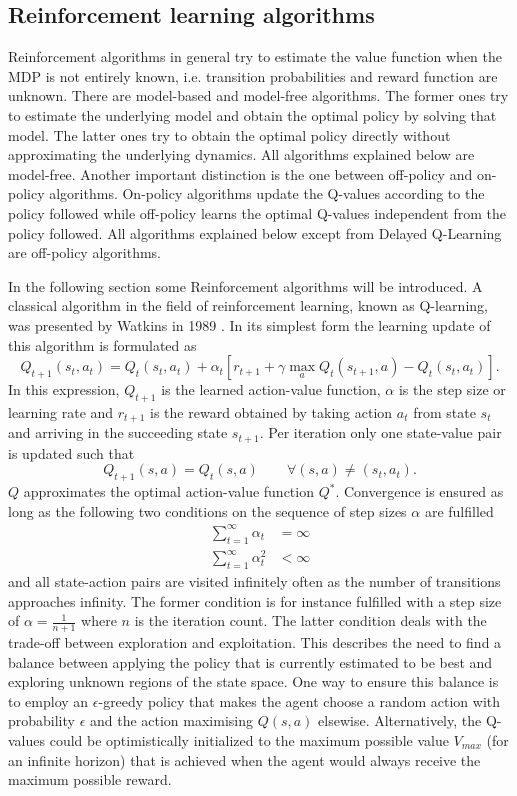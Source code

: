 \documentclass[../main.tex]{subfiles}
\begin{document}
\subsection{Reinforcement learning algorithms}
Reinforcement algorithms in general try to estimate the value function when the MDP is not entirely known, i.e. transition probabilities and reward function are unknown. There are model-based and model-free algorithms. The former ones try to estimate the underlying model and obtain the optimal policy by solving that model. The latter ones try to obtain the optimal policy directly without approximating the underlying dynamics. All algorithms explained below are model-free. Another important distinction is the one between off-policy and on-policy algorithms. On-policy algorithms update the Q-values according to the policy followed while off-policy learns the optimal Q-values independent from the policy followed. All algorithms explained below except from Delayed Q-Learning are off-policy algorithms.\par
In the following section some Reinforcement algorithms will be introduced. A classical algorithm in the field of reinforcement learning, known as Q-learning, was presented by Watkins in 1989 \cite{watkins1992q}. In its simplest form the learning update of this algorithm is formulated as
\begin{equation}
Q_{t+1}(s_t,a_t) = Q_{t}(s_t,a_t) + \alpha_t \left[ r_{t+1}+\gamma \max_a Q_{t}(s_{t+1},a) - Q_{t}(s_t,a_t)\right].
\end{equation}
In this expression, $Q_{t+1}$ is the learned action-value function, $\alpha$ is the step size or learning rate and $r_{t+1}$ is the reward obtained by taking action $a_t$ from state $s_t$ and arriving in the succeeding state $s_{t+1}$.
Per iteration only one state-value pair is updated such that
\begin{equation}
    Q_{t+1}(s,a) = Q_{t}(s,a) \qquad \forall (s,a) \neq (s_t,a_t).
\end{equation}
$Q$ approximates the optimal action-value function $Q^*$. Convergence is ensured as long as the following two conditions on the sequence of step sizes $\alpha$ are fulfilled \cite{jaakkola1994convergence}
\begin{align}\label{eq:stepsize}
    \sum_{t=1}^\infty \alpha_t &= \infty\\
    \sum_{t=1}^\infty \alpha_t^2 &< \infty   
\end{align}
and all state-action pairs are visited infinitely often as the number of transitions approaches infinity. The former condition is for instance fulfilled with a step size of $\alpha = \frac{1}{n+1}$ where $n$ is the iteration count. The latter condition deals with the trade-off between exploration and exploitation. This describes the need to find a balance between applying the policy that is currently estimated to be best and exploring unknown regions of the state space. One way to ensure this balance is to employ an $\epsilon$-greedy policy that makes the agent choose a random action with probability $\epsilon$ and the action maximising $Q(s,a)$ elsewise. Alternatively, the Q-values could be optimistically initialized to the maximum possible value $V_{max}$ (for an infinite horizon) that is achieved when the agent would always receive the maximum possible reward. 
\end{document}
